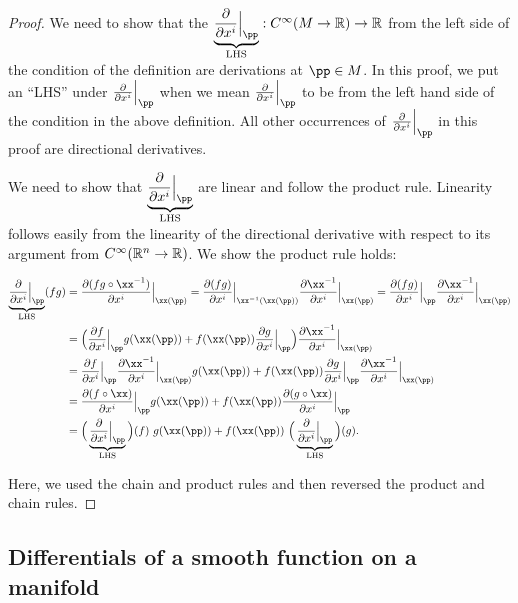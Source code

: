 \begin{proof}
    \newcommand{\pdxiLHS}{\underbrace{\frac{\pd}{\pd x^i}\Big|_\pp}_{\text{LHS}}}

    We need to show that the $\pdxiLHS:C^\infty(M \rightarrow \R) \rightarrow \R$ from the left side of the condition of the definition are derivations at $\pp \in M$. In this proof, we put an ``LHS'' under $\frac{\pd}{\pd x^i}\Big|_\pp$ when we mean $\frac{\pd}{\pd x^i}\Big|_\pp$ to be from the left hand side of the condition in the above definition. All other occurrences of $\frac{\pd}{\pd x^i}\Big|_\pp$ in this proof are directional derivatives.
    
    We need to show that $\pdxiLHS$ are linear and follow the product rule. Linearity follows easily from the linearity of the directional derivative with respect to its argument from $C^\infty(\mathbb{R}^n \rightarrow \mathbb{R})$. We show the product rule holds:
    
    \begin{align*}
       \underbrace{\frac{\pd}{\pd x^i}\Big|_\pp}_{\text{LHS}} (fg)
        &= \frac{\pd (fg \circ \xx^{-1})}{\pd x^i}\Big|_{\xx(\pp)} 
        = \frac{\pd (fg)}{\pd x^i}\Big|_{\xx^{-1}(\xx(\pp))} \frac{\pd \xx^{-1}}{\pd x^i}\Big|_{\xx(\pp)}
        = \frac{\pd (fg)}{\pd x^i}\Big|_\pp \frac{\pd \xx^{-1}}{\pd x^i}\Big|_{\xx(\pp)}
        \\
        &= \Big( \frac{\pd f}{\pd x^i}\Big|_\pp g(\xx(\pp)) + f(\xx(\pp)) \frac{\pd g}{\pd x^i}\Big|_\pp \Big) \frac{\pd \xx^{-1}}{\pd x^i}\Big|_{\xx(\pp)} \\
        &= \frac{\pd f}{\pd x^i}\Big|_\pp \frac{\pd \xx^{-1}}{\pd x^i}\Big|_{\xx(\pp)} g(\xx(\pp))
        + f(\xx(\pp)) \frac{\pd g}{\pd x^i}\Big|_\pp \frac{\pd \xx^{-1}}{\pd x^i}\Big|_{\xx(\pp)}  \\
        &= \frac{\pd (f \circ \xx)}{\pd x^i}\Big|_\pp g(\xx(\pp)) + f(\xx(\pp)) \frac{\pd (g \circ \xx)}{\pd x^i}\Big|_\pp  \\
        &= \Big( \underbrace{\frac{\pd}{\pd x^i}\Big|_\pp}_{\text{LHS}} \Big) (f) \spc g(\xx(\pp)) + f(\xx(\pp)) \spc \Big( \underbrace{\frac{\pd}{\pd x^i}\Big|_\pp}_{\text{LHS}} \Big) (g).
    \end{align*}
    
    Here, we used the chain and product rules and then reversed the product and chain rules.
\end{proof}

\newpage

\subsection*{Differentials of a smooth function on a manifold}

